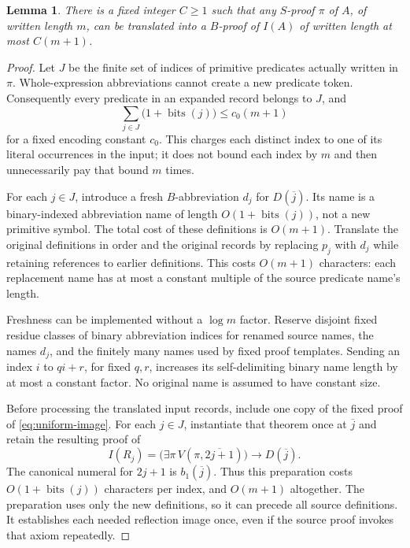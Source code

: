 \documentclass[11pt]{article}
\newtheorem{lemma}[theorem]{Lemma}
\theoremstyle{remark}
\newcommand{\num}[1]{\overline{#1}}
\newcommand{\bits}{\operatorname{bits}}
\begin{document}
\begin{lemma}\label{lem:translate}
There is a fixed integer $C\ge1$ such that any $S$-proof $\pi$ of $A$,
of written length $m$, can be translated into a $B$-proof of $I(A)$
of written length at most $C(m+1)$.
\end{lemma}
\begin{proof}
Let $J$ be the finite set of indices of primitive predicates actually written
in $\pi$. Whole-expression abbreviations cannot create a new predicate token.
Consequently every predicate in an expanded record belongs to $J$, and
\[
 \sum_{j\in J}\bigl(1+\bits(j)\bigr)\le c_0(m+1)
\]
for a fixed encoding constant $c_0$. This charges each distinct index to one
of its literal occurrences in the input; it does not bound each index by $m$
and then unnecessarily pay that bound $m$ times.

For each $j\in J$, introduce a fresh $B$-abbreviation $d_j$ for
$D(\num j)$. Its name is a binary-indexed abbreviation name of length
$O(1+\bits(j))$, not a new primitive symbol. The total cost of these
definitions is $O(m+1)$. Translate the original definitions in order and the
original records by replacing $p_j$ with $d_j$ while retaining references to
earlier definitions. This costs $O(m+1)$ characters: each replacement name
has at most a constant multiple of the source predicate name's length.

Freshness can be implemented without a $\log m$ factor. Reserve disjoint
fixed residue classes of binary abbreviation indices for renamed source
names, the names $d_j$, and the finitely many names used by fixed proof
templates. Sending an index $i$ to $qi+r$, for fixed $q,r$, increases its
self-delimiting binary name length by at most a constant factor. No original
name is assumed to have constant size.

Before processing the translated input records, include one copy of the
fixed proof of \eqref{eq:uniform-image}. For each $j\in J$, instantiate
that theorem once at $\num j$ and retain the resulting proof of
\[
 I(R_j)=\bigl(\exists\pi\,V(\pi,\num{2j+1})\bigr)\to D(\num j).
\]
The canonical numeral for $2j+1$ is $b_1(\num j)$. Thus this preparation
costs $O(1+\bits(j))$ characters per index, and $O(m+1)$ altogether.
The preparation uses only the new definitions, so it can precede all source
definitions. It establishes each needed reflection image once, even if the
source proof invokes that axiom repeatedly.


\end{proof}
\end{document}
